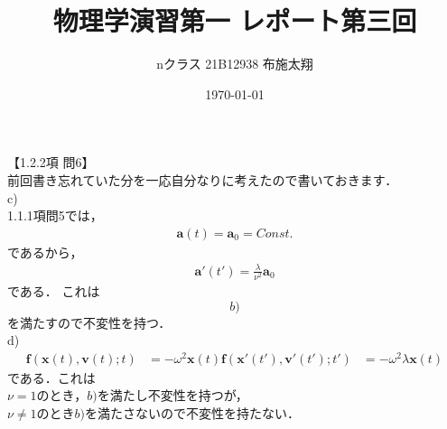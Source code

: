 \documentclass[a4paper,11pt]{jsarticle}
\begin{document}
\title{物理学演習第一 レポート第三回}
\author{nクラス 21B12938 布施太翔}
\date{\today}
\maketitle
\newpage

【1.2.2項 問6】 \\
前回書き忘れていた分を一応自分なりに考えたので書いておきます．\\

c) \\
1.1.1項問5では，
\begin{align*}
  \bm{a}(t) = \bm{a}_0 = Const.
\end{align*}
であるから，
\begin{align*}
  \bm{a}'(t')=\frac{\lambda}{\nu^2}\bm{a}_0
\end{align*}
である．
これは$$b)$$を満たすので不変性を持つ．\\

d) \\
\begin{align*}
  \bm{f}(\bm{x}(t),\bm{v}(t);t)&=- \omega^2 \bm{x}(t)
  \bm{f}(\bm{x}'(t'),\bm{v}'(t');t')&=- \omega^2 \lambda \bm{x}(t)
\end{align*}
である．これは\\
$\nu=1$のとき，$b)$を満たし不変性を持つが，\\
$\nu \neq 1$のとき$b)$を満たさないので不変性を持たない．\\
\end{document}
